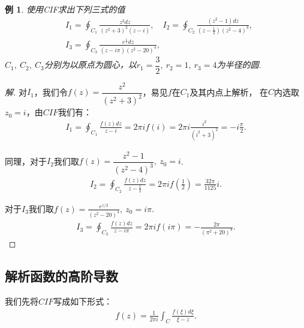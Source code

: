 \documentclass[12pt, a4paper]{ctexbook}
\newtheorem{example}{例}[chapter] %
\begin{document}
                \begin{example}
                    使用CIF求出下列三式的值
                    \begin{align*}
                        &I_1 = \oint_{C_1}\frac{z^2dz}{(z^2+3)^2(z-i)},
                        \quad I_2=\oint_{C_2}\frac{(z^2-1)dz}{(z-\frac{1}{2})(z^2-4)^3},\\
                        &I_3=\oint_{C_3}\frac{e^{\frac{z}{2}}dz}{(z-i\pi)(z^2-20)^4},
                    \end{align*}
                    $C_1,\ C_2,\ C_3$分别为以原点为圆心，以$r_1=\dfrac{3}{2},\ r_2=1,\ r_3=4$为半径的圆.
                \end{example}
                \begin{proof}[解]
                    对$I_1$，我们令$f(z) = \dfrac{z^2}{(z^2+3)^2}$，易见$f$在$C_1$及其内点上解析，
                    在$C$内选取$z_0 = i$，由$CIF$我们有：
                    \begin{align*}
                        I_1=\oint_{C_1}\frac{f(z)dz}{z-i}=2\pi i f(i)=2\pi i\frac{i^2}{(i^2+3)^2}=-i\frac{\pi}{2}.
                    \end{align*}

                    同理，对于$I_2$我们取$f(z) = \dfrac{z^2 - 1}{(z^2 - 4)^3},\ z_0 = i$.
                    \begin{align*}
                        I_2 = \oint_{C_2}\frac{f(z)dz}{z - \frac{1}{2}} = 2\pi i f(\frac{1}{2}) = \frac{32\pi}{1125}i.
                    \end{align*}

                    对于$I_3$我们取$f(z) = \frac{e^{z/2}}{(z^2 - 20)^4},\ z_0 = i\pi$.
                    \begin{align*}
                        I_3 = \oint_{C_3}\frac{f(z)dz}{z-i\pi}=2\pi i f(i\pi) = -\frac{2\pi}{(\pi^2+20)^4}.
                    \end{align*}
                \end{proof}

            \subsection{解析函数的高阶导数}
                我们先将$CIF$写成如下形式：
                \begin{align*}
                    f(z) = \frac{1}{2\pi i}\int_C \frac{f(\xi)d\xi}{\xi - z}.
                \end{align*}
\end{document}
